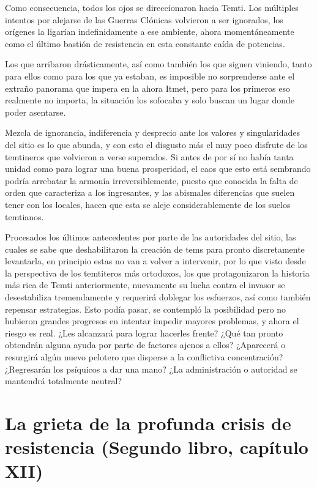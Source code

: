 \documentclass[
]{book}
\begin{document}
Como consecuencia, todos los ojos se direccionaron hacia Temti. Los múltiples intentos por alejarse de las Guerras Clónicas volvieron a ser ignorados, los orígenes la ligarían indefinidamente a ese ambiente, ahora momentáneamente como el último bastión de resistencia en esta constante caída de potencias.

Los que arribaron drásticamente, así como también los que siguen viniendo, tanto para ellos como para los que ya estaban, es imposible no sorprenderse ante el extraño panorama que impera en la ahora Itmet, pero para los primeros eso realmente no importa, la situación los sofocaba y solo buscan un lugar donde poder asentarse.

Mezcla de ignorancia, indiferencia y desprecio ante los valores y singularidades del sitio es lo que abunda, y con esto el disgusto más el muy poco disfrute de los temtineros que volvieron a verse superados. Si antes de por sí no había tanta unidad como para lograr una buena prosperidad, el caos que esto está sembrando podría arrebatar la armonía irreversiblemente, puesto que conocida la falta de orden que caracteriza a los ingresantes, y las abismales diferencias que suelen tener con los locales, hacen que esta se aleje considerablemente de los suelos temtianos.

Procesados los últimos antecedentes por parte de las autoridades del sitio, las cuales se sabe que deshabilitaron la creación de tems para pronto discretamente levantarla, en principio estas no van a volver a intervenir, por lo que visto desde la perspectiva de los temtiteros más ortodoxos, los que protagonizaron la historia más rica de Temti anteriormente, nuevamente su lucha contra el invasor se desestabiliza tremendamente y requerirá doblegar los esfuerzos, así como también repensar estrategias. Esto podía pasar, se contempló la posibilidad pero no hubieron grandes progresos en intentar impedir mayores problemas, y ahora el riesgo es real. ¿Les alcanzará para lograr hacerles frente? ¿Qué tan pronto obtendrán alguna ayuda por parte de factores ajenos a ellos? ¿Aparecerá o resurgirá algún nuevo pelotero que disperse a la conflictiva concentración? ¿Regresarán los psíquicos a dar una mano? ¿La administración o autoridad se mantendrá totalmente neutral?

\hypertarget{la-grieta-de-la-profunda-crisis-de-resistencia-segundo-libro-capuxedtulo-xii}{%
\section{La grieta de la profunda crisis de resistencia (Segundo libro, capítulo XII)}\label{la-grieta-de-la-profunda-crisis-de-resistencia-segundo-libro-capuxedtulo-xii}}
\end{document}

